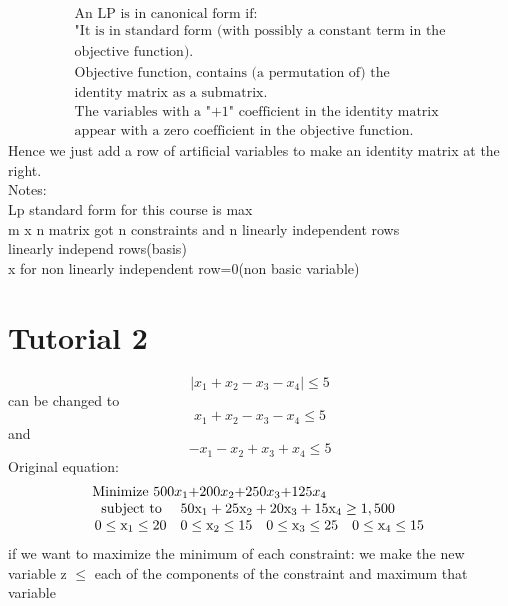 \documentclass{article}
\begin{document}
$$
\begin{array} { l } { \text { An LP is in canonical form if: } } \\ { \text { "It is in standard form (with possibly a constant term in the } } \\ { \text { objective function). } } \\ { \text { Objective function, contains (a permutation of) the } } \\ { \text { identity matrix as a submatrix. } } \\ { \text { The variables with a "+1" coefficient in the identity matrix } } \\ { \text { appear with a zero coefficient in the objective function. } } \end{array}
$$
Hence we just add a row of artificial variables to make an identity matrix at the right.\\
Notes:\\
Lp standard form for this course is max\\
m x n matrix got n constraints and n linearly independent rows\\
linearly independ rows(basis)\\
x for non linearly independent row=0(non basic variable)\\
\section{Tutorial 2}
$$
|{x_1 + x_2 - x_3 - x_4}|\leq 5
$$
can be changed to
$$
x_1 + x_2 - x_3 - x_4 \leq 5
$$
and
$$
-x_1 - x_2 + x_3 + x_4 \leq 5
$$
Original equation:
$$
\begin{array} { l } { \text { Minimize 500$x_1$+200$x_2$+250$x_3$+125$x_4$} } \\ { \begin{array} { r l } { \text { subject to } } & { 50 \mathrm { x } _ { 1 } + 25 \mathrm { x } _ { 2 } + 20 \mathrm { x } _ { 3 } + 15 \mathrm { x } _ { 4 } \geq 1,500 } \\ { 0 \leq \mathrm { x } _ { 1 } \leq 20 } & { 0 \leq \mathrm { x } _ { 2 } \leq 15 \quad 0 \leq \mathrm { x } _ { 3 } \leq 25 \quad 0 \leq \mathrm { x } _ { 4 } \leq 15 } \end{array} } \end{array}
$$
if we want to maximize the minimum of each constraint:
we make the new variable z $\leq$ each of the components of the constraint and maximum that variable
\end{document}
